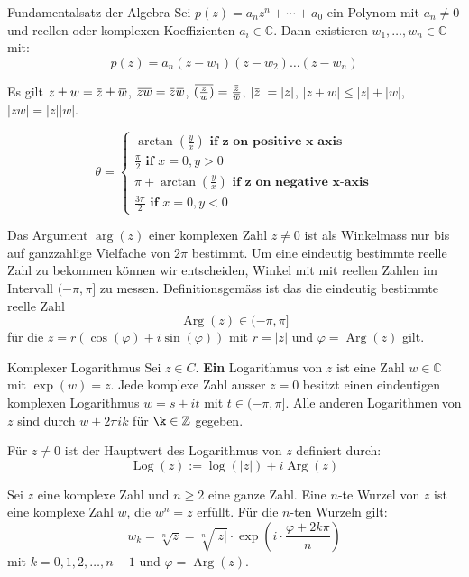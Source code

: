 \documentclass[a4paper,10pt]{article}
\DeclareMathOperator{\Arg}{Arg}
\DeclareMathOperator{\Log}{Log}
\def\C{\mathbb{C}}
\newcommand{\overbar}[1]{\mkern 1.5mu\overline{\mkern-1.5mu#1\mkern-1.5mu}\mkern 1.5mu}
\begin{document}
\begin{mainbox}{Fundamentalsatz der Algebra}
  Sei $p(z) = a_n z^n + \cdots + a_0$ ein Polynom mit $a_n \neq 0$ und reellen oder komplexen Koeffizienten $a_i \in \mathbb{C}$. Dann existieren $w_1, \ldots, w_n \in \C$ mit:
  $$
    p(z) = a_n (z - w_1) (z - w_2) \ldots (z - w_n)
  $$
\end{mainbox}

Es gilt $\overbar{z \pm w} = \overbar{z} \pm \overbar{w}$, $\overbar{zw} = \overbar{z}\overbar{w}$, $\overbar{(\frac{z}{w})} = \frac{\overbar{z}}{\overbar{w}}$, $|\overbar{z}| = |z|$, $|z + w| \leq |z| + |w|$, $|zw| = |z| |w|$.

$$
\theta = \begin{cases}
  \arctan(\frac{y}{x}) \textbf{ if z on positive x-axis}\\
  \frac{\pi}{2} \textbf{ if }x=0, y > 0\\
  \pi + \arctan(\frac{y}{x}) \textbf{ if z on negative x-axis}\\
  \frac{3\pi}{2} \textbf{ if }x=0, y < 0
\end{cases}
$$

Das Argument $\arg(z)$ einer komplexen Zahl $z \neq 0$ ist als Winkelmass nur bis auf ganzzahlige Vielfache von $2\pi$ bestimmt. Um eine eindeutig bestimmte reelle Zahl zu bekommen können wir entscheiden, Winkel mit mit reellen Zahlen im Intervall $(-\pi,\pi]$ zu messen. Definitionsgemäss ist das die eindeutig bestimmte reelle Zahl
$$
\Arg(z) \in (-\pi, \pi]
$$
für die $z = r(\cos(\varphi) + i \sin(\varphi))$ mit $r = |z|$ und $\varphi = \Arg(z)$ gilt.

\begin{mainbox}{Komplexer Logarithmus}
  Sei $z \in C$. \textbf{Ein} Logarithmus von $z$ ist eine Zahl $w \in \C$ mit $\exp(w) = z$. Jede komplexe Zahl ausser $z = 0$ besitzt einen eindeutigen komplexen Logarithmus $w = s + it$ mit $t \in (-\pi, \pi]$. Alle anderen Logarithmen von $z$ sind durch $w + 2\pi ik$ für $\k \in \mathbb{Z}$ gegeben.

  Für $z \neq 0$ ist der Hauptwert des Logarithmus von $z$ definiert durch:
  $$
    \Log(z) := \log(|z|) + i \Arg(z)
  $$
\end{mainbox}

Sei \(z\) eine komplexe Zahl und \(n\geq2\) eine ganze Zahl. Eine \(n\)-te Wurzel von \(z\) ist eine komplexe Zahl \(w\), die \(w^n=z\) erfüllt. Für die $n$-ten Wurzeln gilt:
$$
w_k = \sqrt[n]{z} = \sqrt[n]{\vert z \vert} \cdot \exp\left(i \cdot \frac{\varphi + 2k\pi}{n} \right)
$$
mit $ k = 0,1,2,\dots, n-1$ und $\varphi = \Arg(z)$.
\end{document}
